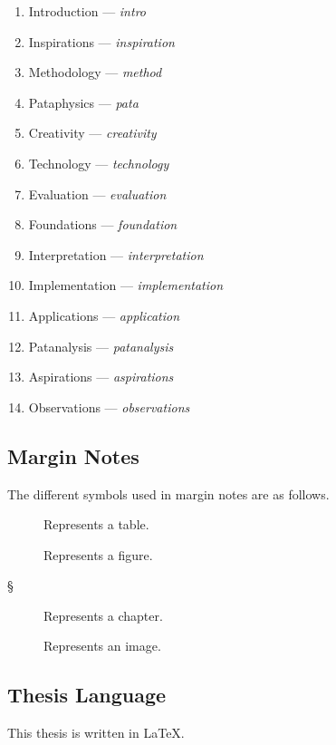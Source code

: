 \begin{enumerate}
  \item Introduction --- \textit{intro}
  \item Inspirations --- \textit{inspiration}
  \item Methodology --- \textit{method}
  \item Pataphysics --- \textit{pata}
  \item Creativity --- \textit{creativity}
  \item Technology --- \textit{technology}
  \item Evaluation --- \textit{evaluation}
  \item Foundations --- \textit{foundation}
  \item Interpretation --- \textit{interpretation}
  \item Implementation --- \textit{implementation}
  \item Applications --- \textit{application}
  \item Patanalysis --- \textit{patanalysis}
  \item Aspirations --- \textit{aspirations}
  \item Observations --- \textit{observations}
\end{enumerate}



\subsection*{Margin Notes}

The different symbols used in margin notes are as follows.

\begin{description}
  \item [] Represents a table.
  \item [] Represents a figure.
  \item [§] Represents a chapter.
  \item [] Represents an image.
\end{description}



\subsection*{Thesis Language}

This thesis is written in \LaTeX.


